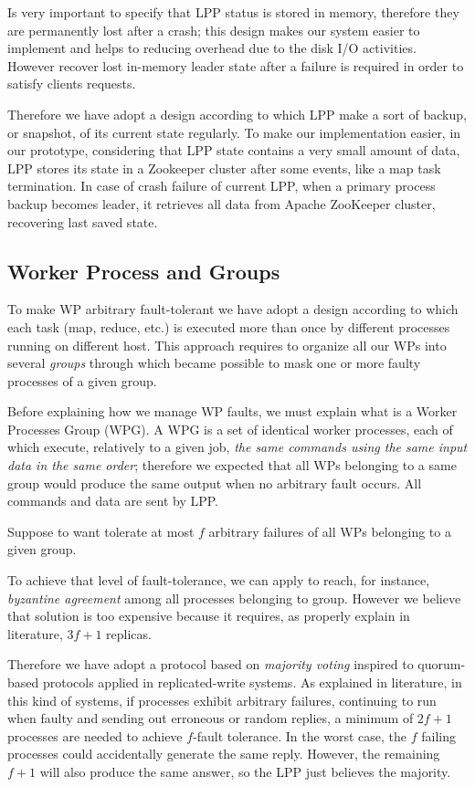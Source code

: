 \documentclass[sigchi]{acmart}
\begin{document}
Is very important to specify that LPP status is stored in memory, therefore they are permanently lost after a crash; this design makes our system easier to implement and helps to reducing overhead due to the disk I/O activities. However recover lost in-memory leader state after a failure is required in order to satisfy clients requests. 

Therefore we have adopt a design according to which LPP make a sort of backup, or snapshot, of its current state regularly. To make our implementation easier, in our prototype, considering that LPP state contains a very small amount of data, LPP stores its state in a Zookeeper cluster after some events, like a map task termination. In case of crash failure of current LPP, when a primary process backup becomes leader, it retrieves all data from Apache ZooKeeper cluster, recovering last saved state.

\subsection{Worker Process and Groups}

To make WP arbitrary fault-tolerant we have adopt a design according to which each task (map, reduce, etc.) is executed more than once by different processes running on different host. This approach requires to organize all our WPs into several \textit{groups} through which became possible to mask one or more faulty processes of a given group. 

Before explaining how we manage WP faults, we must explain what is a Worker Processes Group (WPG). A WPG is a set of identical worker processes, each of which execute, relatively to a given job, \textit{the same commands using the same input data in the same order}; therefore we expected that all WPs belonging to a same group would produce the same output when no arbitrary fault occurs. All commands and data are sent by LPP.

Suppose to want tolerate at most $f$ arbitrary failures of all WPs belonging to a given group. 

To achieve that level of fault-tolerance, we can apply to reach, for instance, \textit{byzantine agreement} among all processes belonging to group. However we believe that solution is too expensive because it requires, as properly explain in literature\citep{SDCC}, $3f + 1$ replicas.

Therefore we have adopt a protocol based on \textit{majority voting} inspired to quorum-based protocols applied in replicated-write systems. As explained in literature\citep{SDCC}, in this kind of systems, if processes exhibit arbitrary failures, continuing to run when faulty and sending out erroneous or random replies, a minimum of $2f+1$ processes are needed to achieve $f$-fault tolerance. In the worst case, the $f$ failing processes could accidentally generate the same reply. However, the remaining $f+1$ will also produce the same answer, so the LPP just believes the majority.
\end{document}
